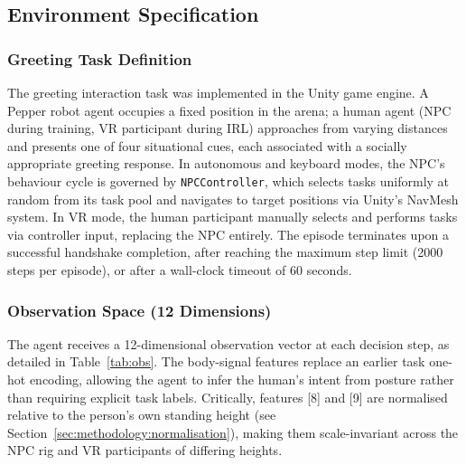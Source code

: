 \documentclass[../report.tex]{subfiles}
\begin{document}
    \subsection{Environment Specification}

    \subsubsection{Greeting Task Definition}

    The greeting interaction task was implemented in the Unity game engine. A Pepper robot agent occupies a fixed position in the arena; a human agent (NPC during training, VR participant during IRL) approaches from varying distances and presents one of four situational cues, each associated with a socially appropriate greeting response. In autonomous and keyboard modes, the NPC's behaviour cycle is governed by \texttt{NPCController}, which selects tasks uniformly at random from its task pool and navigates to target positions via Unity's NavMesh system. In VR mode, the human participant manually selects and performs tasks via controller input, replacing the NPC entirely. The episode terminates upon a successful handshake completion, after reaching the maximum step limit (2000 steps per episode), or after a wall-clock timeout of 60 seconds.

    \subsubsection{Observation Space (12 Dimensions)}

    The agent receives a 12-dimensional observation vector at each decision step, as detailed in Table~\ref{tab:obs}. The body-signal features replace an earlier task one-hot encoding, allowing the agent to infer the human's intent from posture rather than requiring explicit task labels. Critically, features [8] and [9] are normalised relative to the person's own standing height (see Section~\ref{sec:methodology:normalisation}), making them scale-invariant across the NPC rig and VR participants of differing heights.
\end{document}
